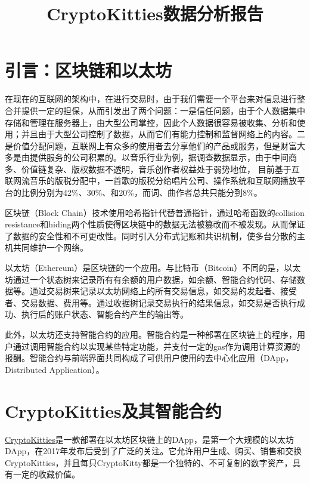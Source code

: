 \documentclass{myreport}
\title{CryptoKitties数据分析报告}
\date{\zhtoday}
\begin{document}
\makecover

\section{引言：区块链和以太坊}
在现在的互联网的架构中，在进行交易时，由于我们需要一个平台来对信息进行整合并提供一定的担保，从而引发出了两个问题：一是信任问题，由于个人数据集中存储和管理在服务器上，由大型公司掌控，因此个人数据很容易被收集、分析和使用；并且由于大型公司控制了数据，从而它们有能力控制和监督网络上的内容。二是价值分配问题，互联网上有众多的使用者去分享他们的产品或服务，但是财富大多是由提供服务的公司积累的。以音乐行业为例，据调查数据显示，由于中间商多、价值链复杂、版权数据不透明，音乐创作者权益处于弱势地位， 目前基于互联网流音乐的版税分配中，一首歌的版税分给唱片公司、操作系统和互联网播放平台的比例分别为42\%、30\%、和20\%，而词、曲作者总共只能分到8\%\cite{mekcoclub2022}。

区块链（Block Chain）技术使用哈希指针代替普通指针，通过哈希函数的collision resistance和hiding两个性质使得区块链中的数据无法被篡改而不被发现。从而保证了数据的安全性和不可更改性。同时引入分布式记账和共识机制，使多台分散的主机共同维护一个网络。

以太坊（Ethereum）是区块链的一个应用。与比特币（Bitcoin）不同的是，以太坊通过一个状态树来记录所有有余额的用户数据，如余额、智能合约代码、存储数据等。通过交易树来记录以太坊网络上的所有交易信息，如交易的发起者、接受者、交易数据、费用等。通过收据树记录交易执行的结果信息，如交易是否执行成功、执行后的账户状态、智能合约产生的输出等。

此外，以太坊还支持智能合约的应用。智能合约是一种部署在区块链上的程序，用户通过调用智能合约以实现某些特定功能，并支付一定的gas作为调用计算资源的报酬。智能合约与前端界面共同构成了可供用户使用的去中心化应用（DApp，Distributed Application）。


\section{CryptoKitties及其智能合约}
\href{https://www.cryptokitties.co}{CryptoKitties}是一款部署在以太坊区块链上的DApp，是第一个大规模的以太坊DApp，在2017年发布后受到了广泛的关注。它允许用户生成、购买、销售和交换CryptoKitties，并且每只CryptoKitty都是一个独特的、不可复制的数字资产，具有一定的收藏价值。
\end{document}
